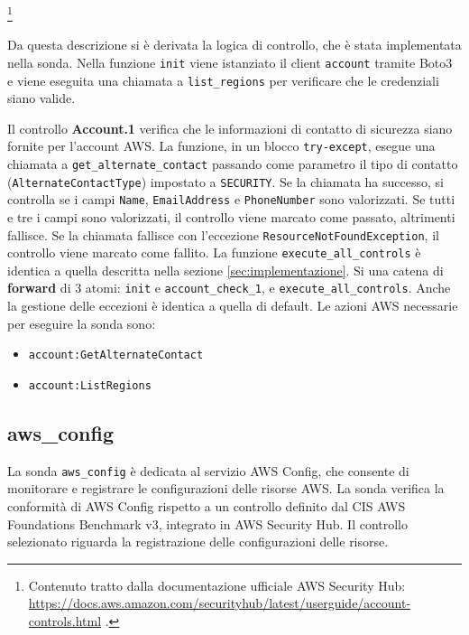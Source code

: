 \footnote{Contenuto tratto dalla documentazione ufficiale AWS Security Hub: \url{https://docs.aws.amazon.com/securityhub/latest/userguide/account-controls.html} .}

Da questa descrizione si è derivata la logica di controllo, che è stata implementata nella sonda. Nella funzione \texttt{init} viene istanziato il client \texttt{account} tramite Boto3 e viene eseguita una chiamata a \texttt{list\_regions} per verificare che le credenziali siano valide.

Il controllo \textbf{Account.1} verifica che le informazioni di contatto di sicurezza siano fornite per l'account AWS. La funzione, in un blocco \texttt{try-except}, esegue una chiamata a \texttt{get\_alternate\_contact} passando come parametro il tipo di contatto (\texttt{AlternateContactType}) impostato a \texttt{SECURITY}. Se la chiamata ha successo, si controlla se i campi \texttt{Name}, \texttt{EmailAddress} e \texttt{PhoneNumber} sono valorizzati. Se tutti e tre i campi sono valorizzati, il controllo viene marcato come passato, altrimenti fallisce. Se la chiamata fallisce con l'eccezione \texttt{ResourceNotFoundException}, il controllo viene marcato come fallito.
La funzione \texttt{execute\_all\_controls} è identica a quella descritta nella sezione \ref{sec:implementazione}. Si una catena di \textbf{forward} di 3 atomi: \texttt{init} e \texttt{account\_check\_1}, e \texttt{execute\_all\_controls}. Anche la gestione delle eccezioni è identica a quella di default.
Le azioni AWS necessarie per eseguire la sonda sono:
\begin{itemize}
    \item \texttt{account:GetAlternateContact}
    \item \texttt{account:ListRegions}
\end{itemize}

\subsection{aws\_config}
\label{sec:config}

La sonda \texttt{aws\_config} è dedicata al servizio AWS Config, che consente di monitorare e registrare le configurazioni delle risorse AWS. La sonda verifica la conformità di AWS Config rispetto a un controllo definito dal CIS AWS Foundations Benchmark v3, integrato in AWS Security Hub. Il controllo selezionato riguarda la registrazione delle configurazioni delle risorse.

